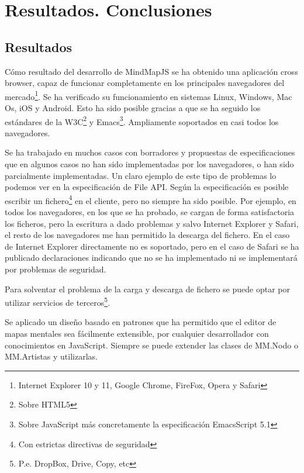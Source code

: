 \newpage\mbox{}\thispagestyle{empty}

\chapter{Resultados. Conclusiones}

\section{Resultados}


Cómo resultado del desarrollo de MindMapJS se ha obtenido una aplicación cross browser, capaz de funcionar completamente en los principales navegadores del mercado\footnote{Internet Explorer 10 y 11, Google Chrome, FireFox, Opera y Safari}. Se ha verificado su funcionamiento en sistemas Linux, Windows, Mac Os, iOS y Android. Esto ha sido posible gracias a que se ha seguido los estándares de la W3C\footnote{Sobre HTML5} y Emacs\footnote{Sobre JavaScript más concretamente la especificación EmacsScript 5.1}. Ampliamente soportados en casi todos los navegadores. 

Se ha trabajado en muchos casos con borradores y propuestas de especificaciones que en algunos casos no han sido implementadas por los navegadores, o han sido parcialmente implementadas. Un claro ejemplo de este tipo de problemas lo podemos ver en la especificación de File API. Según la especificación es posible escribir un fichero\footnote{Con estrictas directivas de seguridad} en el cliente, pero no siempre ha sido posible. Por ejemplo, en todos los navegadores, en los que se ha probado, se cargan de forma satisfactoria los ficheros, pero la escritura a dado problemas y salvo Internet Explorer y Safari, el resto de los navegadores me han permitido la descarga del fichero. En el caso de Internet Explorer directamente no es soportado, pero en el caso de Safari se ha publicado declaraciones indicando que no se ha implementado ni se implementará por problemas de seguridad. 

Para solventar el problema de la carga y descarga de fichero se puede optar por utilizar servicios de terceros\footnote{P.e. DropBox, Drive, Copy, etc}. 

Se aplicado un diseño basado en patrones que ha permitido que el editor de mapas mentales sea fácilmente extensible, por cualquier desarrollador con conocimientos en JavaScript. Siempre se puede extender las clases de MM.Nodo o MM.Artistas y utilizarlas. 

